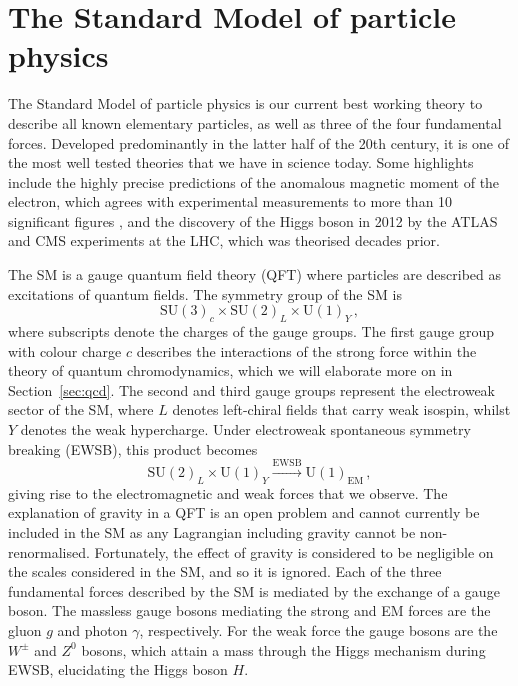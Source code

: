 \documentclass[main.tex]{subfiles}
\begin{document}
\section{The Standard Model of particle physics}
    The Standard Model of particle physics is our current
    best working theory to describe all known elementary particles,
    as well as three of the four fundamental forces. Developed
    predominantly in the latter half of the 20th century, it is
    one of the most well tested theories that we have in science today.
    Some highlights include the highly precise predictions of the
    anomalous magnetic moment of the electron, which agrees with experimental
    measurements to more than 10 significant figures \cite{Aoyama:2017uqe},
    and the discovery of the Higgs boson in 2012 by the ATLAS \cite{ATLAS:2012yve}
    and CMS experiments \cite{CMS:2012qbp} at the LHC,
    which was theorised decades prior.

    The SM is a gauge quantum field theory (QFT) where particles
    are described as excitations of quantum fields. The symmetry group
    of the SM is
    \begin{equation}\label{eqn:SM_gauge}
        \mathrm{SU}(3)_{c} \times \mathrm{SU}(2)_{L} \times \mathrm{U}(1)_{Y}\, ,
    \end{equation}
    where subscripts denote the charges of the gauge groups. The first gauge
    group with colour charge $c$ describes the interactions of the
    strong force within the theory of quantum chromodynamics, which we
    will elaborate more on in Section~\ref{sec:qcd}. The second
    and third gauge groups represent the electroweak sector of the SM, where
    $L$ denotes left-chiral fields that carry weak isospin, whilst $Y$ denotes
    the weak hypercharge. Under electroweak
    spontaneous symmetry breaking (EWSB), this product becomes
    \begin{equation}\label{eqn:SM_SSB}
        \mathrm{SU}(2)_{L} \times \mathrm{U}(1)_{Y} \xrightarrow{\mathrm{EWSB}} \mathrm{U}(1)_{\mathrm{EM}} \, ,
    \end{equation}
    giving rise to the electromagnetic and weak forces that we observe.
    The explanation of gravity in a QFT is an open problem and cannot currently
    be included in the SM as any Lagrangian including gravity cannot be non-renormalised.
    Fortunately, the effect of gravity is considered
    to be negligible on the scales considered in the SM, and so it is ignored.
    Each of the three fundamental forces described by the SM is mediated
    by the exchange of a gauge boson. The massless gauge bosons mediating the strong
    and EM forces are the gluon $g$ and photon $\gamma$,
    respectively. For the weak force the gauge bosons are the $W^{\pm}$
    and $Z^{0}$ bosons, which attain a mass through the Higgs mechanism \cite{Englert:1964et,Higgs:1964pj,Guralnik:1964eu}
    during EWSB, elucidating the Higgs boson $H$.
\end{document}
